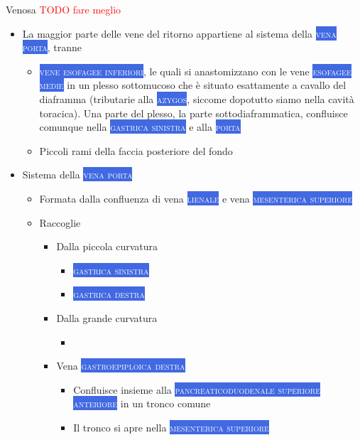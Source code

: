\documentclass[italian,]{article}
\providecommand{\tightlist}{%
  \setlength{\itemsep}{0pt}\setlength{\parskip}{0pt}}
\newcommand{\ven}[1]{\colorbox{RoyalBlue}{\textcolor{white}{\textsc{#1}}}}
\newcommand{\TODO}[1]{\textcolor{red}{\textsf{\footnotesize{TODO #1}}}} %
\begin{document}
Venosa \TODO{fare meglio}

\begin{itemize}
\tightlist
\item
  La maggior parte delle vene del ritorno appartiene al sistema della
  \ven{vena porta}, tranne

  \begin{itemize}
  \tightlist
  \item
    \ven{vene esofagee inferiori}, le quali si anastomizzano con le vene
    \ven{esofagee medie} in un plesso sottomucoso che è situato
    esattamente a cavallo del diaframma (tributarie alla \ven{azygos},
    siccome dopotutto siamo nella cavità toracica). Una parte del
    plesso, la parte sottodiaframmatica, confluisce comunque nella
    \ven{gastrica sinistra} e alla \ven{porta}
  \item
    Piccoli rami della faccia posteriore del fondo
  \end{itemize}
\item
  Sistema della \ven{vena porta}

  \begin{itemize}
  \tightlist
  \item
    Formata dalla confluenza di vena \ven{lienale} e vena
    \ven{mesenterica superiore}
  \item
    Raccoglie

    \begin{itemize}
    \tightlist
    \item
      Dalla piccola curvatura

      \begin{itemize}
      \item
        \ven{gastrica sinistra}
      \item
        \ven{gastrica destra}
      \end{itemize}
    \item
      Dalla grande curvatura

      \begin{itemize}
      \item
        \ven{}
      \end{itemize}
    \item
      Vena \ven{gastroepiploica destra}

      \begin{itemize}
      \tightlist
      \item
        Confluisce insieme alla
        \ven{pancreaticoduodenale superiore anteriore} in un tronco
        comune
      \item
        Il tronco si apre nella \ven{mesenterica superiore}
      \end{itemize}
    \end{itemize}
  \end{itemize}
\end{itemize}
\end{document}
